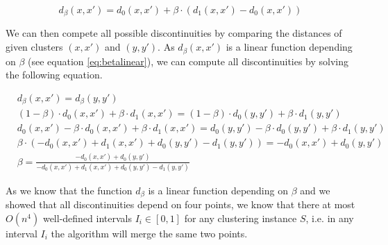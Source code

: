 \begin{equation}
d_\beta(x,x') = d_0(x,x') + \beta \cdot (d_1(x,x') - d_0(x,x'))
\label{eq:betalinear}
\end{equation}

We can then compete all possible discontinuities by comparing the distances of given clusters $(x, x')$ and $(y, y')$. As $d_\beta(x,x')$ is a linear function depending on $\beta$ (see equation \ref{eq:betalinear}), we can compute all discontinuities by solving the following equation.

\begin{align*}
&d_\beta(x,x') = d_\beta(y,y')\\
&(1 - \beta) \cdot d_0(x,x') + \beta \cdot d_1(x,x') = (1 - \beta) \cdot d_0(y,y') + \beta \cdot d_1(y,y')\\
&d_0(x,x') - \beta \cdot d_0(x,x')  + \beta \cdot d_1(x,x') = d_0(y,y') - \beta \cdot d_0(y,y') + \beta \cdot d_1(y,y')\\
&\beta \cdot (- d_0(x,x') + d_1(x,x') + d_0(y,y') - d_1(y,y')) = - d_0(x,x') + d_0(y,y')\\
&\beta = \frac{- d_0(x,x') + d_0(y,y')}{- d_0(x,x') + d_1(x,x') + d_0(y,y') - d_1(y,y')}
\label{eq:discont}
\end{align*}

As we know that the function $d_\beta$ is a linear function depending on $\beta$ and we showed that all discontinuities depend on four points, we know that there at most $O(n^4)$ well-defined intervals $I_i \in [0,1]$ for any clustering instance $S$, i.e. in any interval $I_i$ the algorithm will merge the same two points.

